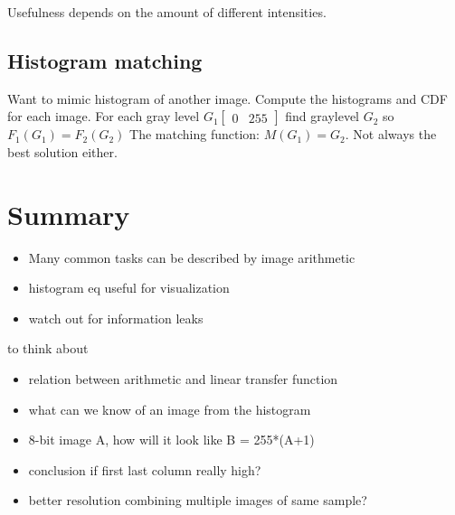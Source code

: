 Usefulness depends on the amount of different intensities. 

\subsection*{Histogram matching}
Want to mimic histogram of another image. Compute the histograms and CDF for each image. For each gray level $G_1 \begin{bmatrix} 0& 255 \end{bmatrix}$ find graylevel $G_2$ so $F_1(G_1) = F_2(G_2)$
The matching function: $M(G_1) = G_2$. Not always the best solution either. 



\section{Summary}

\begin{itemize}
    \item Many common tasks can be described by image arithmetic
    \item histogram eq useful for visualization 
    \item watch out for information leaks
\end{itemize}

to think about
\begin{itemize}
    \item relation between arithmetic and linear transfer function
    \item what can we know of an image from the histogram
    \item 8-bit image A, how will it look like B = 255*(A+1)
    \item conclusion if first last column really high?
    \item better resolution combining multiple images of same sample?
\end{itemize}


